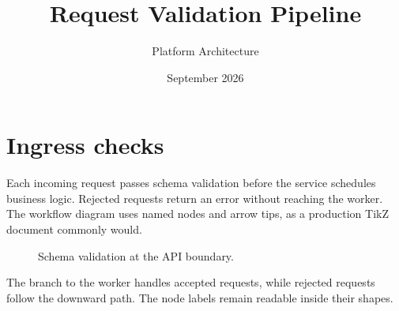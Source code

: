 \documentclass{article}
\title{Request Validation Pipeline}
\author{Platform Architecture}
\date{September 2026}
\begin{document}
\maketitle

\section{Ingress checks}
Each incoming request passes schema validation before the service schedules
business logic. Rejected requests return an error without reaching the worker.
The workflow diagram uses named nodes and arrow tips, as a production TikZ
document commonly would.

\begin{figure}
\centering
{}
\caption{Schema validation at the API boundary.}
\label{fig:request-pipeline}
\end{figure}

The branch to the worker handles accepted requests, while rejected requests
follow the downward path. The node labels remain readable inside their shapes.
\end{document}
